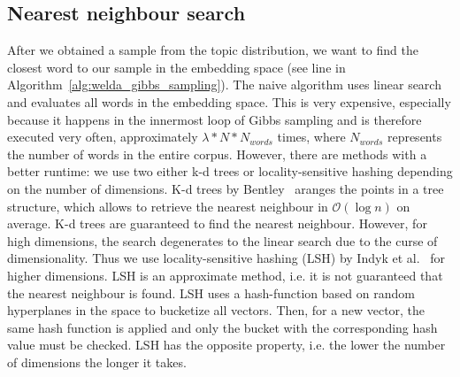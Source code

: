 \documentclass[
        a4paper,
        titlepage,
        twoside,
        parskip
        ]{scrbook}
\theoremstyle{break}
\begin{document}
\subsection{Nearest neighbour search}
After we obtained a sample from the topic distribution, we want to find the closest word to our sample in the embedding space (see line in Algorithm~\ref{alg:welda_gibbs_sampling}).
The naive algorithm uses linear search and evaluates all words in the embedding space.
This is very expensive, especially because it happens in the innermost loop of Gibbs sampling and is therefore executed very often, approximately $\lambda * N * N_{words}$ times, where $N_{words}$ represents the number of words in the entire corpus.
However, there are methods with a better runtime: we use two either k-d trees or locality-sensitive hashing depending on the number of dimensions.
K-d trees by Bentley~\cite{Bentley1975} aranges the points in a tree structure, which allows to retrieve the nearest neighbour in $\mathcal{O}(\log n)$ on average.
K-d trees are guaranteed to find the nearest neighbour.
However, for high dimensions, the search degenerates to the linear search due to the curse of dimensionality.
Thus we use locality-sensitive hashing (LSH) by Indyk et al.~\cite{Indyk1998} for higher dimensions.
LSH is an approximate method, i.e. it is not guaranteed that the nearest neighbour is found.
LSH uses a hash-function based on random hyperplanes in the space to bucketize all vectors.
Then, for a new vector, the same hash function is applied and only the bucket with the corresponding hash value must be checked.
LSH has the opposite property, i.e. the lower the number of dimensions the longer it takes.
\end{document}
